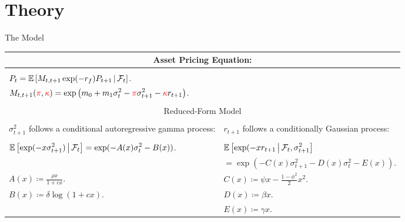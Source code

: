 \documentclass[smaller, aspectratio=169]{beamer}
\let\emph\relax
\newcommand*{\rkappa}{\textcolor{red}{\kappa}}
\newcommand*{\rpi}{\textcolor{red}{\pi}}
\begin{document}
\section{Theory}

\begin{frame}[c]{The Model}

    \begin{tabularx}{\textwidth}{X | X}
        \multicolumn{2}{c}{Asset Pricing Equation:} \\
        \toprule 
        \multicolumn{2}{l}{} \\
%
        \multicolumn{2}{l}{\emph{--} $\displaystyle P_t = \mathbb{E}\left[M_{t, t+1} \exp(-r_f) P_{t+1} \,\middle\vert\, \mathcal{F}_{t} \right]$.} \\
%
        \multicolumn{2}{l}{\emph{--} $\displaystyle M_{t, t+1}(\rpi, \rkappa) = \exp\left(m_0 + m_1 \sigma^2_t - \rpi \sigma^2_{t+1} - \rkappa r_{t+1}\right)$.} \\ 
        \multicolumn{2}{l}{} \\
%
        \toprule 
        \multicolumn{2}{c}{Reduced-Form Model} \\
        \toprule \\
%
        $\sigma^2_{t+1}$ follows a conditional autoregressive gamma process: & $r_{t+1}$ follows a conditionally Gaussian process: \\
%
        \midrule \\
%
        $\displaystyle \mathbb{E}\left[\exp(-x \sigma^2_{t+1}) \,\middle\vert\, \mathcal{F}_t\right] = \exp(-A(x) \sigma^2_{t} - B(x)) $. & 
        $\displaystyle \mathbb{E}\left[\exp(-x r_{t+1} \,\middle\vert\, \mathcal{F}_t, \sigma^2_{t+1} \right]$  \\ 
        &\qquad $ \displaystyle = \exp(-C(x) \sigma^2_{t+1} - D(x) \sigma^2_t - E(x))$. \\ 
%
        $\displaystyle A(x) \coloneqq \frac{\rho x}{1 + c x}$. & $\displaystyle C(x) \coloneqq \psi x - \frac{1-\phi^2}{2} x^2 $. \\
%
        $\displaystyle B(x) \coloneqq \delta \log(1 + c x)$. & $\displaystyle D(x) \coloneqq \beta x$. \\
%
        &  $\displaystyle E(x) \coloneqq \gamma x$.  \\
%
    \end{tabularx}
\end{frame}
\end{document}
